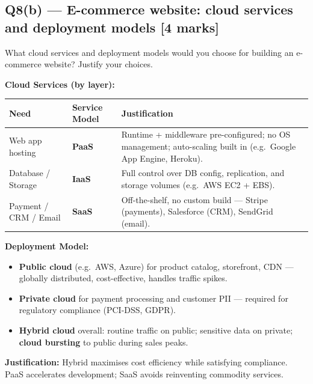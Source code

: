 \documentclass[12pt, a4paper]{article}
\newenvironment{qbox}{\begin{mdframed}[style=qframe]}{\end{mdframed}}
\newenvironment{solbox}{\begin{mdframed}[style=solframe]}{\end{mdframed}}
\newcommand{\qmarks}[1]{\hfill\textbf{\color{orange!70!black}[#1 marks]}}
\begin{document}
\subsection{Q8(b) --- E-commerce website: cloud services and deployment models
  \texorpdfstring{\qmarks{4}}{}}
\begin{qbox}What cloud services and deployment models would you choose for building an
e-commerce website? Justify your choices.\end{qbox}
\begin{solbox}
\textbf{Cloud Services (by layer):}
\begin{center}\renewcommand{\arraystretch}{1.3}
\begin{tabularx}{\linewidth}{l l X}
\toprule
\textbf{Need} & \textbf{Service Model} & \textbf{Justification} \\
\midrule
Web app hosting & \textbf{PaaS} & Runtime + middleware pre-configured; no OS management; auto-scaling built in (e.g.\ Google App Engine, Heroku). \\
Database / Storage & \textbf{IaaS} & Full control over DB config, replication, and storage volumes (e.g.\ AWS EC2 + EBS). \\
Payment / CRM / Email & \textbf{SaaS} & Off-the-shelf, no custom build --- Stripe (payments), Salesforce (CRM), SendGrid (email). \\
\bottomrule
\end{tabularx}\end{center}

\textbf{Deployment Model:}
\begin{itemize}[leftmargin=1.4cm, itemsep=3pt]
  \item \textbf{Public cloud} (e.g.\ AWS, Azure) for product catalog, storefront, CDN ---
    globally distributed, cost-effective, handles traffic spikes.
  \item \textbf{Private cloud} for payment processing and customer PII ---
    required for regulatory compliance (PCI-DSS, GDPR).
  \item \textbf{Hybrid cloud} overall: routine traffic on public; sensitive data on private;
    \textbf{cloud bursting} to public during sales peaks.
\end{itemize}

\textbf{Justification:} Hybrid maximises cost efficiency while satisfying compliance.
PaaS accelerates development; SaaS avoids reinventing commodity services.
\end{solbox}

\end{document}
